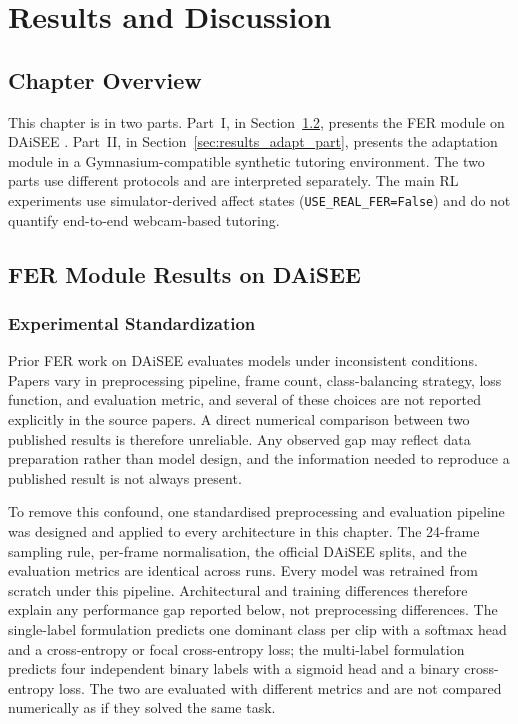 \chapter{Results and Discussion}\label{chap:results}

\section{Chapter Overview}\label{sec:results_overview}

This chapter is in two parts. Part~I, in
Section~\ref{sec:results_fer}, presents the \ac{FER} module on \ac{DAiSEE}
\cite{gupta_daisee_2016}. Part~II, in
Section~\ref{sec:results_adapt_part}, presents the adaptation
module in a Gymnasium-compatible synthetic tutoring environment.
The two parts use different protocols and are interpreted
separately. The main \ac{RL} experiments use simulator-derived affect
states (\texttt{USE\_REAL\_FER=False}) and do not quantify
end-to-end webcam-based tutoring.

\section{\ac{FER} Module Results on \ac{DAiSEE}}\label{sec:results_fer}

\subsection{Experimental Standardization}\label{sec:results_fer_standardization}

Prior \ac{FER} work on \ac{DAiSEE} evaluates models under inconsistent
conditions. Papers vary in preprocessing pipeline, frame count,
class-balancing strategy, loss function, and evaluation metric, and
several of these choices are not reported explicitly in the source
papers. A direct numerical comparison between two published
results is therefore unreliable. Any observed gap may reflect data
preparation rather than model design, and the information needed
to reproduce a published result is not always present.

To remove this confound, one standardised preprocessing and
evaluation pipeline was designed and applied to every architecture
in this chapter. The 24-frame sampling rule, per-frame normalisation, the official \ac{DAiSEE} splits, and the evaluation metrics are identical across runs. Every model was
retrained from scratch under this pipeline. Architectural and
training differences therefore explain any performance gap reported
below, not preprocessing differences. The single-label formulation
predicts one dominant class per clip with a softmax head and a
cross-entropy or focal cross-entropy loss; the multi-label
formulation predicts four independent binary labels with a sigmoid
head and a binary cross-entropy loss. The two are evaluated with
different metrics and are not compared numerically as if they
solved the same task.

